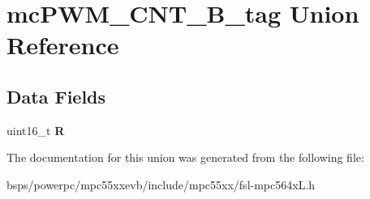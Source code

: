 \hypertarget{unionmcPWM__CNT__16B__tag}{}\section{mc\+P\+W\+M\+\_\+\+C\+N\+T\+\_\+B\+\_\+tag Union Reference}
\label{unionmcPWM__CNT__16B__tag}
\subsection*{Data Fields}
\begin{DoxyCompactItemize}
\item 
\mbox{\label{unionmcPWM__CNT__16B__tag_a66dcd12f2ea9496ef9daacfeeb3e870b}} 
uint16\+\_\+t {\bfseries R}
\end{DoxyCompactItemize}


The documentation for this union was generated from the following file\+:\begin{DoxyCompactItemize}
\item 
bsps/powerpc/mpc55xxevb/include/mpc55xx/fsl-\/mpc564x\+L.\+h\end{DoxyCompactItemize}
